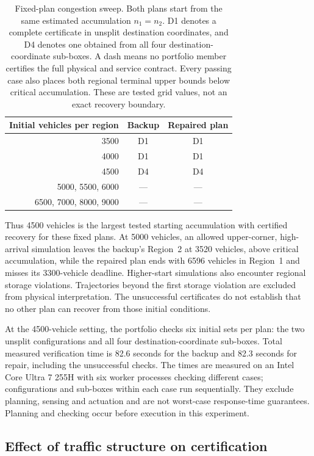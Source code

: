 \begin{table}[!htbp]
\centering\small
\caption{Fixed-plan congestion sweep. Both plans start from the same
estimated accumulation $n_1=n_2$. D1 denotes a complete certificate in
unsplit destination coordinates, and D4 denotes one obtained from all
four destination-coordinate sub-boxes. A dash means no portfolio member
certifies the full physical and service contract. Every passing case
also places both regional terminal upper bounds below critical accumulation.
These are tested grid values, not an exact recovery boundary.}
\label{tab:congestion-depth}
\begin{tabular}{@{}rcc@{}}
\toprule
Initial vehicles per region & Backup & Repaired plan\\
\midrule
3500 & D1 & D1\\
4000 & D1 & D1\\
4500 & D4 & D4\\
5000, 5500, 6000 & --- & ---\\
6500, 7000, 8000, 9000 & --- & ---\\
\bottomrule
\end{tabular}
\end{table}

Thus 4500 vehicles is the largest tested starting accumulation with
certified recovery for these fixed plans. At 5000 vehicles, an allowed
upper-corner, high-arrival simulation leaves the backup's Region~2 at
3520 vehicles, above critical accumulation, while the repaired plan
ends with 6596 vehicles in Region~1 and misses its 3300-vehicle deadline.
Higher-start simulations also encounter regional storage violations.
Trajectories beyond the first storage violation are excluded from physical
interpretation. The unsuccessful certificates do not establish that no
other plan can recover from those initial conditions.

At the 4500-vehicle setting, the portfolio checks six initial sets per
plan: the two unsplit configurations and all four destination-coordinate
sub-boxes. Total measured verification time is 82.6 seconds for the backup
and 82.3 seconds for repair, including the unsuccessful checks. The times
are measured on an Intel Core Ultra 7 255H with six worker processes
checking different cases; configurations and sub-boxes within each case
run sequentially. They exclude planning, sensing and actuation and are
not worst-case response-time guarantees. Planning and checking occur
before execution in this experiment.

\subsection{Effect of traffic structure on certification}
\label{sec:structure-results}
\label{sec:structure-online}

